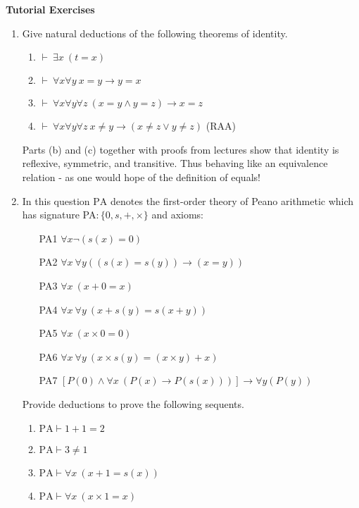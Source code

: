 \documentclass[11pt]{report}
\begin{document}
\newpage
{\bf Tutorial Exercises}
\begin{enumerate}

	\item Give natural deductions of the following theorems of identity.
	
	\begin{enumerate}
		\item $\vdash \ \exists x \ (t = x)$
		\item $\vdash \ \forall x  \forall y \ x = y \to y = x$
		\item $\vdash \ \forall x \forall y \forall z \ (x = y \land y = z) \to x = z$ 
		\item $\vdash \ \forall x \forall y \forall z \ x \neq y \to (x \neq z \lor y \neq z)$ \hspace{5cm} (RAA)

	\end{enumerate}

	Parts (b) and (c) together with proofs from lectures show that identity is reflexive, symmetric, and transitive. Thus behaving like an equivalence relation - as one would hope of the definition of equals!
	
	\item In this question $\text{PA}$ denotes the first-order theory of Peano arithmetic which has signature PA$: \{0,s,+,\times\}$ and axioms:
	
	\begin{enumerate}
		\item[PA1] $\forall x \lnot(s(x) = 0)$
		\item[PA2] $\forall x \ \forall y ((s(x) = s(y)) \to (x = y))$
		\item[PA3] $\forall x \ (x + 0 = x)$
		\item[PA4] $\forall x \ \forall y \ (x + s(y) = s(x + y))$
		\item[PA5] $\forall x \ (x \times 0 = 0)$
		\item[PA6] $\forall x \ \forall y \ (x \times s(y) = (x \times y) + x)$
		\item[PA7] $[P(0) \land \forall x \ (P(x) \to P(s(x)))] \rightarrow \forall y (P(y))$
	\end{enumerate}	
	
	Provide deductions to prove the following sequents. 
	
	\begin{enumerate}
		\item $\text{PA} \vdash 1 + 1 = 2$
		\item $\text{PA} \vdash 3 \neq 1$
		\item $\text{PA} \vdash \forall x \ (x + 1 = s(x))$
		\item $\text{PA} \vdash \forall x \ (x \times 1 = x)$ 		
	\end{enumerate}


\end{enumerate}
\end{document}
